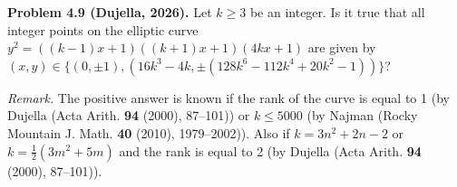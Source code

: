 \textbf{Problem 4.9 (Dujella, 2026).} Let $k \geqslant 3$ be an integer. Is it true that all integer points on the elliptic curve $y^2=((k-1)x+1)((k+1)x+1)(4kx+1)$ are given by $(x,y) \in \{(0,\pm 1),(16k^3-4k,\pm(128k^6-112k^4+20k^2-1))\}$?

\medskip

\textit{Remark.} The positive answer is known if the rank of the curve is equal to 1 (by Dujella (Acta Arith. \textbf{94} (2000), 87--101)) or $k \leqslant 5000$ (by Najman (Rocky Mountain J. Math. \textbf{40} (2010), 1979--2002)). Also if $k=3n^2+2n-2$ or $k=\frac{1}{2}(3m^2+5m)$ and the rank is equal to 2 (by Dujella (Acta Arith. \textbf{94} (2000), 87--101)).

